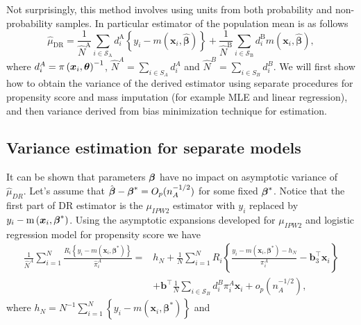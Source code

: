 \documentclass[
  letterpaper,
  DIV=11,
  numbers=noendperiod]{scrreprt}
\begin{document}
Not surprisingly, this method involves using units from both probability
and non-probability samples. In particular estimator of the population
mean is as follows \[
\begin{equation*}
    \hat{\mu}_{\mathrm{DR}}=\frac{1}{\hat{N}^{\mathrm{A}}} \sum_{i \in \mathcal{S}_{\mathrm{A}}} d_i^{\mathrm{A}}\left\{y_i-m\left(\boldsymbol{x}_i, \hat{\boldsymbol{\beta}}\right)\right\}+\frac{1}{\hat{N}^{\mathrm{B}}} \sum_{i \in \mathcal{S}_{\mathrm{B}}} d_i^{\mathrm{B}} m\left(\boldsymbol{x}_i, \hat{\boldsymbol{\beta}}\right),
\end{equation*}
\] where \(d_i^A = \pi \left(\boldsymbol{x}_i, \boldsymbol{\theta}\right)^{-1}\),
\(\hat{N}^A = \sum_{i \in S_A} d_i^A\) and
\(\hat{N}^B = \sum_{i \in S_B} d_i^B\). We will first show how to obtain
the variance of the derived estimator using separate procedures for
propensity score and mass imputation (for example MLE and linear
regression), and then variance derived from bias minimization technique
for estimation.

\hypertarget{variance-estimation-for-separate-models}{%
\subsection{Variance estimation for separate
models}\label{variance-estimation-for-separate-models}}

It can be shown that parameters \(\boldsymbol{\beta}\) have no impact on asymptotic
variance of \(\hat{\mu}_{DR}\). Let's assume that
\(\hat{\boldsymbol{\beta}} - \boldsymbol{\beta}^* = O_p(n_A^{-1/2})\) for some fixed
\(\boldsymbol{\beta}^*\). Notice that the first part of DR estimator is the
\(\mu_{IPW2}\) estimator with \(y_i\) replaced by
\(y_i - \operatorname{m}\left(\boldsymbol{x}_i,\boldsymbol{\beta}^*\right)\). Using the
asymptotic expansions developed for \(\mu_{IPW2}\) and logistic
regression model for propensity score we have \[
\begin{equation}
\begin{aligned}
\frac{1}{\hat{N}^A} \sum_{i=1}^N \frac{R_i\left\{y_i-m\left(\boldsymbol{x}_i, \boldsymbol{\beta}^*\right)\right\}}{\hat{\pi}_i^A}= & h_N+\frac{1}{N} \sum_{i=1}^N R_i\left\{\frac{y_i-m\left(\boldsymbol{x}_i, \boldsymbol{\beta}^*\right)-h_N}{\pi_i^A}-\mathbf{b}_3^{\top} \boldsymbol{x}_i\right\} \\
& +\mathbf{b}^{\top} \frac{1}{N} \sum_{i \in \mathcal{S}_B} d_i^B \pi_i^A \boldsymbol{x}_i+o_p\left(n_A^{-1 / 2}\right),
\end{aligned}
\end{equation}
\] where
\(h_N=N^{-1} \sum_{i=1}^N\left\{y_i-m\left(\boldsymbol{x}_i, \boldsymbol{\beta}^*\right)\right\}\)
and
\end{document}
